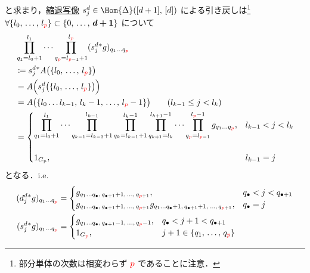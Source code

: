 \documentclass[TQFT_main]{subfiles}
\begin{document}
と求まり，\hyperref[def:SimpSet]{縮退写像} $s^d_j \in \Hom{\Delta}  ([d+1],\, [d])$ による引き戻しは\footnote{部分単体の次数は相変わらず $\textcolor{red}{p}$ であることに注意．} $\forall \{l_0,\, \dots,\, l_{\textcolor{red}{p}}\} \subset \{0,\, \dots,\, \bm{d+1}\}$ について
\begin{align}
    &\prod_{q_1 = l_0+1}^{l_1} \cdots \prod_{q_{\textcolor{red}{p}} = l_{\textcolor{red}{p} - 1} + 1}^{l_{\textcolor{red}{p}}} (s^d_j{}^* g)_{q_1 \dots q_{\textcolor{red}{p}}} \\
    &\coloneqq s^d_j{}^* A \bigl(\{l_0,\, \dots,\, l_{\textcolor{red}{p}}\}\bigr) \\
    &= A \Bigl( s^d_j \bigl(\{l_0,\, \dots,\, l_{\textcolor{red}{p}}\} \bigr)  \Bigr) \\
    &= A \bigl( \{l_0 \dots l_{k-1},\, l_{k}-1,\, \dots,\, l_{\textcolor{red}{p}}-1\}  \bigr) \qquad (l_{k-1} \le j < l_k) \\
    &= \begin{cases}
        \displaystyle \prod_{q_1 = l_0+1}^{l_1} \cdots \prod_{q_{k-1} = l_{k-2} + 1}^{l_{k-1}}\prod_{q_k = l_{k-1}+1}^{l_k - 1} \prod_{q_{k+1} = l_{k}}^{l_{k+1} - 1} \cdots \prod_{q_{\textcolor{red}{p}} = l_{\textcolor{red}{p} - 1}}^{l_{\textcolor{red}{p}}-1} g_{q_1 \dots q_{\textcolor{red}{p}}},  &l_{k-1} < j < l_k \\
        & \\
        1_{G_{\mathrm{p}}}, &l_{k-1} = j
    \end{cases}
\end{align}
となる．i.e.
\begin{align}
    (d^d_j{}^* g)_{q_1\dots q_{\textcolor{red}{p}}}
    &= \begin{cases}
        g_{q_1 \dots q_\bullet,\, q_{\bullet+1} + 1,\, \dots,\, q_{\textcolor{red}{p} +1}}, &q_\bullet < j < q_{\bullet + 1} \\
        g_{q_1 \dots q_\bullet,\, q_{\bullet+1} + 1,\, \dots,\, q_{\textcolor{red}{p} +1}} g_{q_1 \dots q_\bullet + 1,\, q_{\bullet+1} + 1,\, \dots ,\, q_{\textcolor{red}{p} +1}}, &q_\bullet = j
    \end{cases} \\
    (s^d_j{}^* g)_{q_1 \dots q_{\textcolor{red}{p}}}
    &= \begin{cases}
        g_{q_1 \dots q_\bullet,\, q_{\bullet+1} - 1,\, \dots,\, q_{\textcolor{red}{p}}-1}, &q_\bullet < j+1 < q_{\bullet+1} \\
        1_{G_{\textcolor{red}{p}}}, &j+1 \in \{q_1,\, \dots,\, q_{\textcolor{red}{p}}\}
    \end{cases}
\end{align}
\end{document}
